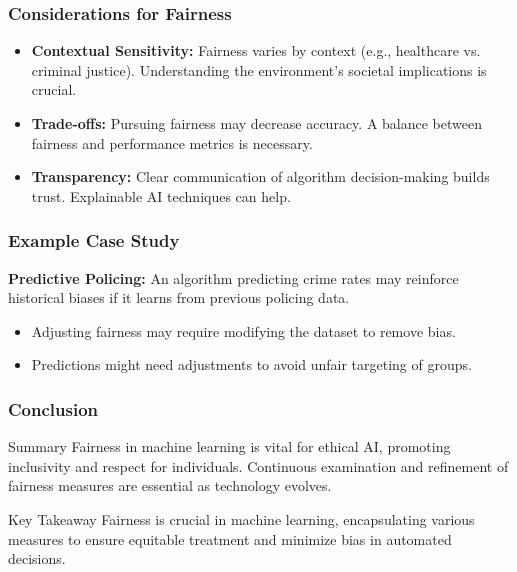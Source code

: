 \documentclass[aspectratio=169]{beamer}
\begin{document}
\begin{frame}[fragile]
    \frametitle{Considerations for Fairness}
    \begin{itemize}
        \item \textbf{Contextual Sensitivity:} Fairness varies by context (e.g., healthcare vs. criminal justice). Understanding the environment's societal implications is crucial.
        
        \item \textbf{Trade-offs:} Pursuing fairness may decrease accuracy. A balance between fairness and performance metrics is necessary.
        
        \item \textbf{Transparency:} Clear communication of algorithm decision-making builds trust. Explainable AI techniques can help.
    \end{itemize}
\end{frame}

\begin{frame}[fragile]
    \frametitle{Example Case Study}
    \textbf{Predictive Policing:} An algorithm predicting crime rates may reinforce historical biases if it learns from previous policing data. 
    \begin{itemize}
        \item Adjusting fairness may require modifying the dataset to remove bias.
        \item Predictions might need adjustments to avoid unfair targeting of groups.
    \end{itemize}
\end{frame}

\begin{frame}[fragile]
    \frametitle{Conclusion}
    \begin{block}{Summary}
        Fairness in machine learning is vital for ethical AI, promoting inclusivity and respect for individuals. Continuous examination and refinement of fairness measures are essential as technology evolves. 
    \end{block}
    \begin{block}{Key Takeaway}
        Fairness is crucial in machine learning, encapsulating various measures to ensure equitable treatment and minimize bias in automated decisions.
    \end{block}
\end{frame}
\end{document}
